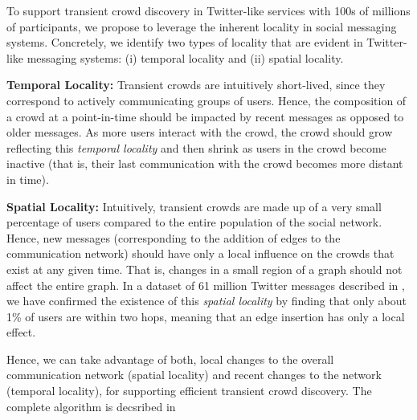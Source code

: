 \documentclass{sig-alternate}
\begin{document}
To support transient crowd discovery in Twitter-like services with 100s of
millions of participants, we propose to leverage the inherent locality in social
messaging systems. Concretely, we identify two types of locality that are
evident in Twitter-like messaging systems: (i) temporal locality and (ii) spatial
locality.

\medskip \noindent\textbf{Temporal Locality:} Transient crowds are
intuitively short-lived, since they correspond to actively communicating groups
of users. Hence, the composition of a crowd at a point-in-time should be impacted
by recent messages as opposed to older messages. As more users interact with the
crowd, the crowd should grow reflecting this \textit{temporal locality} and then
shrink as users in the crowd become inactive (that is, their last communication
with the crowd becomes more distant in time).

\medskip \noindent \textbf{Spatial Locality:} Intuitively, transient crowds are
made up of a very small percentage of users compared to the entire population of
the social network. Hence, new messages (corresponding to the addition of edges
to the communication network) should have only a local influence on the crowds
that exist at any given time. That is, changes in a small region of a graph
should not affect the entire graph. In a dataset of 61 million Twitter messages
described in \cite{Kamath:2011:TCD}, we have confirmed the existence of
this \textit{spatial locality} by finding that only about 1\% of users are within
two hops, meaning that an edge insertion has only a local effect.

\medskip Hence, we can take advantage of both, local changes to the overall
communication network (spatial locality) and recent changes to the network
(temporal locality), for supporting efficient transient crowd discovery. The complete algorithm is decsribed in \cite{Kamath:2011:TCD}
\end{document}
